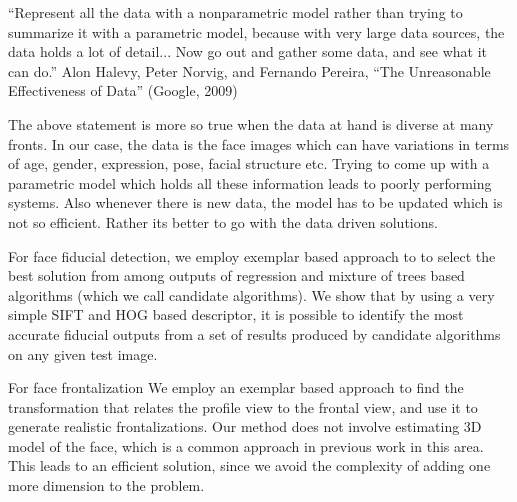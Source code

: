 “Represent all the data with a nonparametric model rather than trying to
summarize it with a parametric model, because with very large data sources, the
data holds a lot of detail... Now go out and gather some data, and see what it can
do.”
Alon Halevy, Peter Norvig, and Fernando Pereira,
“The Unreasonable Effectiveness of Data” (Google, 2009)

The above statement is more so true when the data at hand is diverse at many fronts. In our case, 
the data is the face images which can have variations in terms of age, gender, expression, pose, 
facial structure etc. Trying to come up with a parametric model which holds all these information
leads to poorly performing systems. Also whenever there is new data, the model has to be updated
which is not so efficient. Rather its better to go with the data driven solutions.

For face fiducial detection, we employ exemplar based approach to to select the best solution 
from among outputs of regression and mixture of trees based algorithms (which we call candidate 
algorithms). We show that by using a very simple SIFT and HOG based descriptor, it is possible to 
identify the most accurate fiducial outputs from a set of results produced by candidate algorithms 
on any given test image. 

For face frontalization We employ an exemplar based approach to find the transformation that relates 
the profile view to the frontal view, and use it to generate realistic frontalizations. Our method 
does not involve estimating 3D model of the face, which is a common approach in previous work in 
this area. This leads to an efficient solution, since we avoid the complexity of adding one more 
dimension to the problem. 
